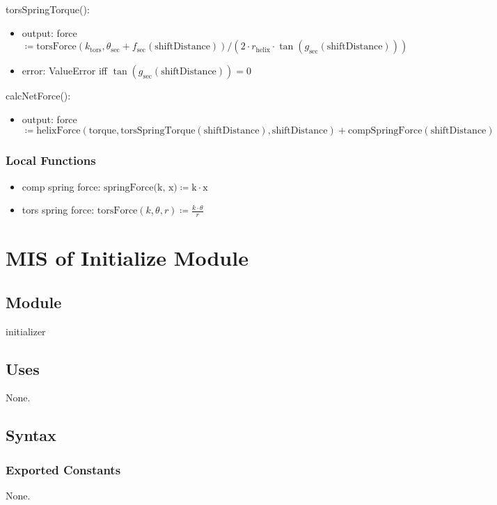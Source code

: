 \documentclass[12pt, titlepage]{article}
\begin{document}
\noindent torsSpringTorque():
\begin{itemize}
  \item output: force $\coloneq \text{torsForce} (k_\text{tors}, \theta_\text{sec} + f_\text{sec}(\text{shiftDistance})) / (2 \cdot r_\text{helix} \cdot \tan(g_{\text{sec}}(\text{shiftDistance})))$
  \item error: ValueError iff $\tan(g_{\text{sec}}(\text{shiftDistance})) = 0$
\end{itemize}

\noindent calcNetForce():
\begin{itemize}
  \item output: force $\coloneq \text{helixForce}(\text{torque}, \text{torsSpringTorque}(\text{shiftDistance}), \text{shiftDistance}) + \text{compSpringForce}(\text{shiftDistance}) $
\end{itemize}

\subsubsection{Local Functions}

\begin{itemize}
  \item comp spring force: $\text{springForce(k, x)} \coloneq \text{k} \cdot \text{x}$
  \item tors spring force: $\text{torsForce}(k, \theta, r) \coloneq \frac{k \cdot \theta}{r}$ 
\end{itemize}

\newpage
\section{MIS of Initialize Module} \label{Module_initialize}
\subsection{Module}

initializer

\subsection{Uses}

None.

\subsection{Syntax}

\subsubsection{Exported Constants}
None.
\end{document}
